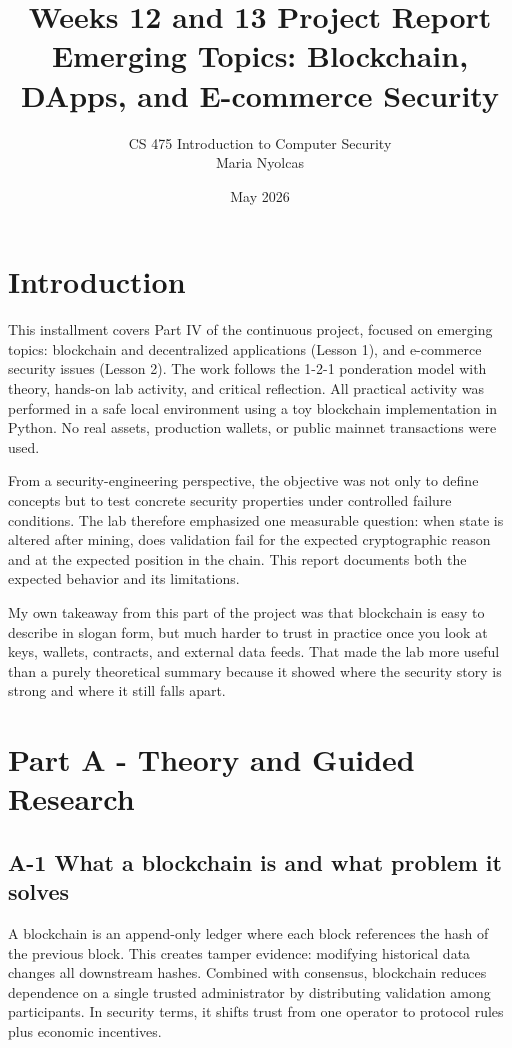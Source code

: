 \documentclass[10pt,a4paper]{article}
\title{Weeks 12 and 13 Project Report \\ Emerging Topics: Blockchain, DApps, and E-commerce Security}
\author{CS 475 Introduction to Computer Security \\ Maria Nyolcas}
\date{May 2026}
\begin{document}
\maketitle

\section*{Introduction}
This installment covers Part IV of the continuous project, focused on emerging topics: blockchain and decentralized applications (Lesson 1), and e-commerce security issues (Lesson 2). The work follows the 1-2-1 ponderation model with theory, hands-on lab activity, and critical reflection. All practical activity was performed in a safe local environment using a toy blockchain implementation in Python. No real assets, production wallets, or public mainnet transactions were used.

From a security-engineering perspective, the objective was not only to define concepts but to test concrete security properties under controlled failure conditions. The lab therefore emphasized one measurable question: when state is altered after mining, does validation fail for the expected cryptographic reason and at the expected position in the chain. This report documents both the expected behavior and its limitations.

My own takeaway from this part of the project was that blockchain is easy to describe in slogan form, but much harder to trust in practice once you look at keys, wallets, contracts, and external data feeds. That made the lab more useful than a purely theoretical summary because it showed where the security story is strong and where it still falls apart.

\section*{Part A - Theory and Guided Research}

\subsection*{A-1 What a blockchain is and what problem it solves}
A blockchain is an append-only ledger where each block references the hash of the previous block. This creates tamper evidence: modifying historical data changes all downstream hashes. Combined with consensus, blockchain reduces dependence on a single trusted administrator by distributing validation among participants. In security terms, it shifts trust from one operator to protocol rules plus economic incentives.
\end{document}
